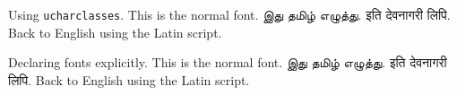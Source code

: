 \documentclass{article}
\begin{document}
\color{blue}
Using \texttt{ucharclasses}. This is the normal font. இது தமிழ் எழுத்து. इति देवनागरी लिपि. Back to English using the Latin script.

\medskip
\color{blue}

Declaring fonts explicitly. This is the normal font. {\tamilfont\color{red} இது தமிழ் எழுத்து.} {\devanagarifont\color{green} इति देवनागरी लिपि.} Back to English using the Latin script.
\end{document}
